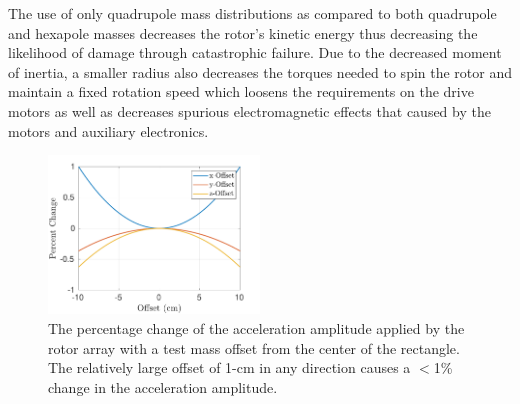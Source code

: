 \documentclass[superscriptaddress, twocolumn, prd]{revtex4-1}
\begin{document}
The use of only quadrupole mass distributions as compared to both quadrupole and hexapole masses \cite{ncal} decreases the rotor's kinetic energy thus decreasing the likelihood of damage through catastrophic failure. Due to the decreased moment of inertia, a smaller radius also decreases the torques needed to spin the rotor and maintain a fixed rotation speed which loosens the requirements on the drive motors as well as decreases spurious electromagnetic effects that caused by the motors and auxiliary electronics. 




\begin{figure}[!h]
\centering \includegraphics[width=0.5\textwidth]{Super4_Offset.pdf}
\caption{The percentage change of the acceleration amplitude applied by the rotor array with a test mass offset from the center of the rectangle. The relatively large offset of 1-cm in any direction causes a $<$1\% change in the acceleration amplitude.}
\label{offset} 
\end{figure}
\end{document}
